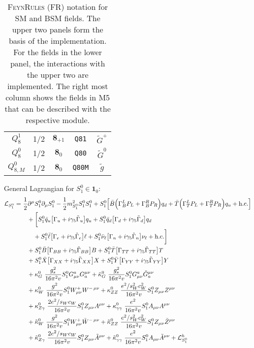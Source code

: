 \documentclass[preprintnumbers,nofootinbib,showpacs,eqsecnum,pre,12pt]{revtex4-1}
\begin{document}
\begin{table}
\begin{tabular}{@{}ccccc@{}}
		$Q_8^1$ & 1/2 & $\mathbf{8}_{+1}$ & \texttt{Q81}  & $\tilde G^+$\\
		$Q_8^0$ & 1/2 & $\mathbf{8}_{0}$ & \texttt{Q80} & $\tilde G^0$\\
		$Q_{8,M}^0$ & 1/2 & $\mathbf{8}_{0}$ & \texttt{Q80M} & $\tilde g$\\
		\hline
	\end{tabular}
	\caption{\textsc{FeynRules} (FR) notation for SM and BSM fields. The upper two panels form the basis of the implementation. For the fields in the lower panel, the interactions with the upper two are implemented. The right most column shows the fields in M5 that can be described with the respective module.}
	\label{tab:frfields}
\end{table}


\noindent
General Lagrangian for $S_1^0\in \mathbf 1_0$:
\begin{align}
{\cal L}_{S_1^0} = &\
\frac12 \partial^\mu S_1^0 \partial_\mu S_1^0
- \frac12 m^2_{S_1^0} S_1^0 S_1^0
+ S_1^0 \Big[
\bar B\Big(\Gamma_{B}^{L}P_L+\Gamma_{B}^{R}P_R\Big)q_d
+ \bar T\Big(\Gamma_{T}^{L}P_L+\Gamma_{T}^{R}P_R\Big)q_u
+ {\rm h.c.} \Big]\nonumber\\
&\quad + \bigg[
S_1^0 \bar q_u      \big[ \Gamma_{u} + i\gamma_5\tilde\Gamma_{u}
\big] q_u
+ S_1^0 \bar q_d      \big[ \Gamma_{d} + i\gamma_5\tilde\Gamma_{d}
\big] q_d \Big.\nonumber \\
&\Big. \quad\quad + S_1^0 \bar \ell     \big[ \Gamma_{e} + i\gamma_5\tilde\Gamma_{e}
\big] \ell
+ S_1^0 \bar \nu_\ell \big[ \Gamma_{n} + i\gamma_5\tilde\Gamma_{n}
\big] \nu_\ell + {\rm h.c.} \bigg]\nonumber\\
&\quad  
+ S_1^0 \bar B      \big[ \Gamma_{BB} + i\gamma_5\tilde\Gamma_{BB}
\big] B
+ S_1^0 \bar T      \big[ \Gamma_{TT} + i\gamma_5\tilde\Gamma_{TT}
\big] T\nonumber \\
&\quad
+ S_1^0 \bar X      \big[ \Gamma_{XX} + i\gamma_5\tilde\Gamma_{XX}
\big] X
+ S_1^0 \bar Y      \big[ \Gamma_{YY} + i\gamma_5\tilde\Gamma_{YY}
\big] Y \nonumber\\
&\quad
+ \kappa_{G}^0\ \frac{g_s^2}{16\pi^2 v} S_1^0 G_{\mu\nu}^a G_a^{\mu\nu}
+ \tilde\kappa_{G}^0\ \frac{g_s^2}{16\pi^2 v} S_1^0 G_{\mu\nu}^a\tilde G_a^{\mu\nu}\nonumber\\
&\quad
+ \kappa_{W}^0\ \frac{g^2  }{16\pi^2 v} S_1^0 W^+_{\mu\nu} W^{-\,\mu\nu}
+ \kappa_{ZZ}^0\ \frac{e^2/s_W^2c_W^2 }{16\pi^2 v} S_1^0 Z_{\mu\nu}   Z^{\mu\nu}\nonumber\\
&\quad
+ \kappa_{Z\gamma}^0\ \frac{2 e^2/s_Wc_W  }{16\pi^2 v} S_1^0 Z_{\mu\nu}   A^{\mu\nu}
+ \kappa_{\gamma\gamma}^0\ \frac{e^2 }{16\pi^2 v} S_1^0 A_{\mu\nu}   A^{\mu\nu}\nonumber\\
&\quad
+ \tilde\kappa_{W}^0\ \frac{g^2  }{16\pi^2 v}
S_1^0 W^+_{\mu\nu}\tilde W^{-\,\mu\nu}
+ \tilde\kappa_{ZZ}^0\ \frac{e^2/s_W^2c_W^2  }{16\pi^2 v}
S_1^0 Z_{\mu\nu}  \tilde Z^{\mu\nu}\nonumber\\
&\quad
+ \tilde\kappa_{Z\gamma}^0\ \frac{2 e^2/s_W c_W  }{16\pi^2 v}
S_1^0 Z_{\mu\nu}  \tilde A^{\mu\nu}
+ \tilde\kappa_{ \gamma\gamma}^0\ \frac{e^2 }{16\pi^2 v}
S_1^0 A_{\mu\nu}  \tilde A^{\mu\nu}   + {\cal L}_{S_1^0}^h    
\end{align}
\end{document}

